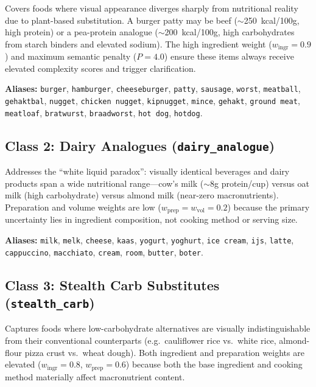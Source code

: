 Covers foods where visual appearance diverges sharply from nutritional reality due to plant-based substitution. A burger patty may be beef ($\sim$250~kcal/100g, high protein) or a pea-protein analogue ($\sim$200~kcal/100g, high carbohydrates from starch binders and elevated sodium). The high ingredient weight ($w_{\text{ingr}} = 0.9$) and maximum semantic penalty ($P = 4.0$) ensure these items always receive elevated complexity scores and trigger clarification.

\medskip
\begin{sloppypar}
\noindent\textbf{Aliases:} \texttt{burger}, \texttt{hamburger}, \texttt{cheeseburger}, \texttt{patty}, \texttt{sausage}, \texttt{worst}, \texttt{meatball}, \texttt{gehaktbal}, \texttt{nugget}, \texttt{chicken nugget}, \texttt{kipnugget}, \texttt{mince}, \texttt{gehakt}, \texttt{ground meat}, \texttt{meatloaf}, \texttt{bratwurst}, \texttt{braadworst}, \texttt{hot dog}, \texttt{hotdog}.
\end{sloppypar}

\subsection*{Class 2: Dairy Analogues (\texttt{dairy\_analogue})}

Addresses the ``white liquid paradox'': visually identical beverages and dairy products span a wide nutritional range---cow's milk ($\sim$8g protein/cup) versus oat milk (high carbohydrate) versus almond milk (near-zero macronutrients). Preparation and volume weights are low ($w_{\text{prep}} = w_{\text{vol}} = 0.2$) because the primary uncertainty lies in ingredient composition, not cooking method or serving size.

\medskip
\begin{sloppypar}
\noindent\textbf{Aliases:} \texttt{milk}, \texttt{melk}, \texttt{cheese}, \texttt{kaas}, \texttt{yogurt}, \texttt{yoghurt}, \texttt{ice cream}, \texttt{ijs}, \texttt{latte}, \texttt{cappuccino}, \texttt{macchiato}, \texttt{cream}, \texttt{room}, \texttt{butter}, \texttt{boter}.
\end{sloppypar}

\subsection*{Class 3: Stealth Carb Substitutes (\texttt{stealth\_carb})}

Captures foods where low-carbohydrate alternatives are visually indistinguishable from their conventional counterparts (e.g.\ cauliflower rice vs.\ white rice, almond-flour pizza crust vs.\ wheat dough). Both ingredient and preparation weights are elevated ($w_{\text{ingr}} = 0.8$, $w_{\text{prep}} = 0.6$) because both the base ingredient and cooking method materially affect macronutrient content.

